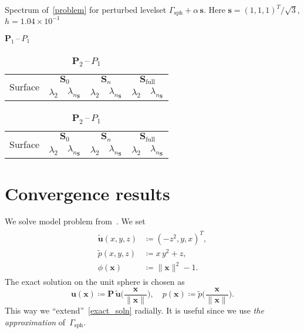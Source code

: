 \documentclass[12pt]{article}
\newcommand{\vect}[1]{\boldsymbol{\mathbf{#1}}}
\newcommand{\sphere}{{\Gamma_{\text{sph}}}}
\begin{document}
\begin{table}[h]
	\centering
	\caption{Spectrum of~\eqref{problem} for perturbed levelset $\sphere + \alpha\,\vect s$. Here $\vect s = (1, 1, 1)^T/\sqrt{3}$, $h = 1.04\times10^{-1}$} 
	\label{tab:p1p1_shift_h=0.104167}
	\small
	\begin{subtable}{1.\linewidth}
		\centering
		\caption{$\vect P_1$\,--\,$P_1$}
		\begin{tabular}[1.3]{|c|c|c|c|c|c|c|}
			\hline
			\multirow{2}{*}{Surface} & \multicolumn{2}{c|}{$\vect S_0$} & \multicolumn{2}{c|}{$\vect S_n$} & \multicolumn{2}{c|}{$\vect S_{\text{full}}$} \\ 
			\cline{2-7}
			& $\lambda_2$ & $\lambda_{n_{\vect S}}$ & $\lambda_2$ & $\lambda_{n_{\vect S}}$ & $\lambda_2$ & $\lambda_{n_{\vect S}}$ \\ 
			\hline
			
		\end{tabular}
	\end{subtable}
	\vskip 4mm
	\begin{subtable}{1.\linewidth}
		\centering
		\caption{$\vect P_2$\,--\,$P_1$}
		\begin{tabular}[1.3]{|c|c|c|c|c|c|c|}
			\hline
			\multirow{2}{*}{Surface} & \multicolumn{2}{c|}{$\vect S_0$} & \multicolumn{2}{c|}{$\vect S_n$} & \multicolumn{2}{c|}{$\vect S_{\text{full}}$} \\ 
			\cline{2-7}
			& $\lambda_2$ & $\lambda_{n_{\vect S}}$ & $\lambda_2$ & $\lambda_{n_{\vect S}}$ & $\lambda_2$ & $\lambda_{n_{\vect S}}$ \\ 
			\hline
			
		\end{tabular}%
	\end{subtable}
\end{table}

\clearpage

\section{Convergence results}\label{sec:conv}

We solve model problem from~\cite[p.\,20]{surfstokes}. We set
\begin{align}\begin{split}\label{exact_soln}
	\tilde{\vect u}(x, y, z) &\coloneqq (-z^2, y, x)^T, \\
	\tilde p(x, y, z) &\coloneqq x\,y^2 + z, \\
	\phi(\vect x) &\coloneqq \|\vect x\|^2 - 1.
\end{split}\end{align}
The exact solution on the unit sphere is chosen as 
\begin{equation}\label{exact_soln_2}
	\vect u(\vect x) \coloneqq \vect P\,\tilde{\vect u}\big(\frac{\vect x}{\|\vect x\|}\big), \quad
	p(\vect x) \coloneqq \tilde p\big(\frac{\vect x}{\|\vect x\|}\big).
\end{equation}
This way we ``extend''~\eqref{exact_soln} radially. It is useful since we use \textit{the approximation} of~$\sphere$.
\end{document}
